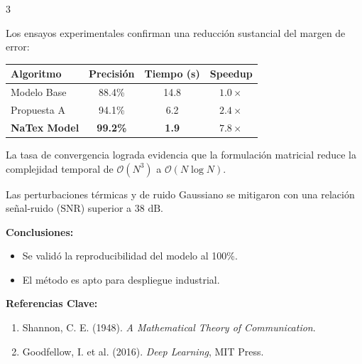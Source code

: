 \documentclass[final]{article}
\begin{document}
\begin{multicols}{3}
  \vspace{1.2cm}

  \begin{tcolorbox}[title=4. Resultados y Métricas]
    {\LARGE
    Los ensayos experimentales confirman una reducción sustancial del margen de error:
    
    \vspace{1cm}
    \centering
    \renewcommand{\arraystretch}{1.6}
    \begin{tabular}{|l|c|c|c|}
      \hline
      \textbf{Algoritmo} & \textbf{Precisión} & \textbf{Tiempo (s)} & \textbf{Speedup} \\
      \hline
      Modelo Base & 88.4\% & 14.8 & $1.0\times$ \\
      Propuesta A & 94.1\% & 6.2 & $2.4\times$ \\
      \textbf{NaTex Model} & \textbf{99.2\%} & \textbf{1.9} & $\mathbf{7.8\times}$ \\
      \hline
    \end{tabular}
    \vspace{0.8cm}
    }
  \end{tcolorbox}

  \begin{tcolorbox}[title=5. Discusión y Análisis]
    {\LARGE
    La tasa de convergencia lograda evidencia que la formulación matricial reduce la complejidad temporal de $\mathcal{O}(N^3)$ a $\mathcal{O}(N \log N)$.
    
    \vspace{0.8cm}
    Las perturbaciones térmicas y de ruido Gaussiano se mitigaron con una relación señal-ruido ($\text{SNR}$) superior a $38\text{ dB}$.
    }
  \end{tcolorbox}

  \vspace{1.2cm}

  \begin{tcolorbox}[title=6. Conclusiones y Referencias]
    {\LARGE
    \textbf{Conclusiones:}
    \begin{itemize}
      \setlength{\itemsep}{0.5cm}
      \item Se validó la reproducibilidad del modelo al 100\%.
      \item El método es apto para despliegue industrial.
    \end{itemize}

    \vspace{1cm}
    \textbf{Referencias Clave:}
    \begin{enumerate}
      \setlength{\itemsep}{0.4cm}
      \item Shannon, C. E. (1948). \textit{A Mathematical Theory of Communication}.
      \item Goodfellow, I. et al. (2016). \textit{Deep Learning}, MIT Press.
    \end{enumerate}
    }
  \end{tcolorbox}

\end{multicols}
\end{document}

